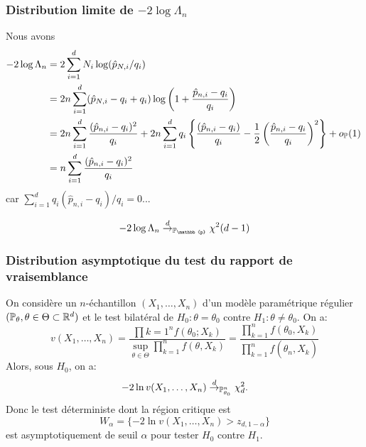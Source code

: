 \begin{frame}
\frametitle{Distribution limite de $-2 \log \Lambda_n$}
Nous avons
\begin{align*}
-2 \log \Lambda_n &= 2\sum_{i=1}^d N_i \log( \hat{p}_{N,i}/q_i) \\
                  &= 2 n \sum_{i=1}^d  (\hat{p}_{N,i} - q_i + q_i) \log\left( 1 + \frac{\hat{p}_{n,i}-q_i}{q_i} \right) \\
                  &= 2 n \sum_{i=1}^d \frac{(\hat{p}_{n,i}-q_i)^2}{q_i} + 2 n \sum_{i=1}^d q_i \left\{ \frac{(\hat{p}_{n,i}-q_i)}{q_i} - \frac{1}{2} \left(\frac{\hat{p}_{n,i}-q_i}{q_i} \right)^2 \right\} + o_{\operatorname{{\mathbb P}}}(1) \, \\
                  &= n \sum_{i=1}^d \frac{(\hat{p}_{n,i}-q_i)^2}{q_i}
\end{align*}
car $\sum_{i=1}^d q_i (\hat{p}_{n,i} - q_i)/q_i= 0$...

\alert{
\[
-2 \log \Lambda_n \dlim_{\PP_{\mathbb{p}}} \chi^2(d-1)
\]
}

\end{frame}



\begin{frame}
\frametitle{Distribution asymptotique du test du rapport de vraisemblance}
\begin{theo}
On considère un $n$-échantillon $(X_1,\dots,X_n)$ d'un modèle paramétrique régulier $(\operatorname{{\mathbb P}}_\theta, \theta \in \Theta \subset \mathbb{R}^d)$ et le test bilat\'{e}ral de $H_{0} :  \theta=\theta_{0}$  contre $H_{1} :  \theta\neq\theta_{0}$.  On a:
$$
v(X_1,\dots,X_n)=\frac{\prod{k=1}^n f(\theta_{0};X_k)}{\sup_{\theta\in\Theta} \prod_{k=1}^n f(\theta,X_k)}=\frac{\prod_{k=1}^n f(\theta_0,X_k)}{\prod_{k=1}^n f(\hat{\theta}_{n},X_k)}
$$
 Alors, sous $H_{0}$, on a:
$$
-2\ln v(X_1,\dots,X_n)\stackrel{d}{\rightarrow}_{\operatorname{{\mathbb P}}_{\theta_0}^n} \chi_{d}^{2}.
$$
 Donc le test d\'{e}terministe dont la r\'{e}gion critique est
$$
W_\alpha=\{-2\ln v(X_1,\dots,X_n)>z_{d,1-\alpha}\}
$$
est asymptotiquement de seuil $\alpha$ pour tester $H_{0}$  contre $H_{1}$.
\end{theo}
\end{frame}

